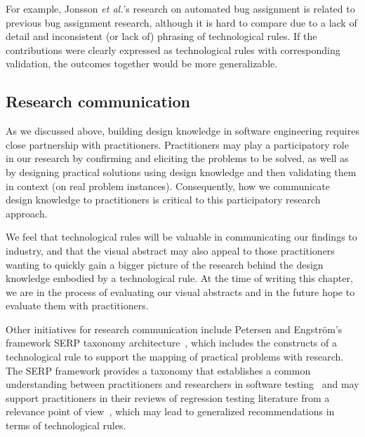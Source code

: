 \documentclass[graybox]{svmult}
\newcommand{\peggy}[1]{\textcolor{blue}{{\it [Peggy says: #1]}}}
\newcommand{\peggy}[1]{}
\begin{document}
For example, Jonsson \emph{et al.}'s research on automated bug assignment is related to previous bug assignment research, although it is hard to compare due to a lack of detail and inconsistent (or lack of) phrasing of technological rules. If the contributions were clearly expressed as technological rules with corresponding validation, the outcomes together would be more generalizable.



\subsection{Research communication}
\label{sec:communication}

As we discussed above, building design knowledge in software engineering requires close partnership with practitioners. 
Practitioners may play a participatory role in our research by confirming and eliciting the problems to be solved, as well as by designing practical solutions using design knowledge and then validating them in context (on real problem instances). 
Consequently, how we communicate design knowledge to practitioners is critical to this participatory research approach.

We feel that technological rules will be valuable in communicating our findings to industry, and that the visual abstract may also appeal to those practitioners wanting to quickly gain a bigger picture of the research behind the design knowledge embodied by a technological rule. 
At the time of writing this chapter, we are in the process of evaluating our visual abstracts and in the future hope to evaluate them with practitioners.


Other initiatives for research communication include Petersen and Engstr\"om's framework SERP taxonomy architecture~\cite{petersen_finding_2014}, which includes the constructs of a technological rule  
to support the mapping of practical problems with research. 
The SERP framework provides a taxonomy that establishes a common understanding between practitioners and researchers in software testing~\cite{engstrom_SERP-test_2017} and may support practitioners in their reviews of regression testing literature from a relevance point of view~\cite{ali_search_2019}, which may lead to generalized recommendations in terms of technological rules. 
\end{document}
